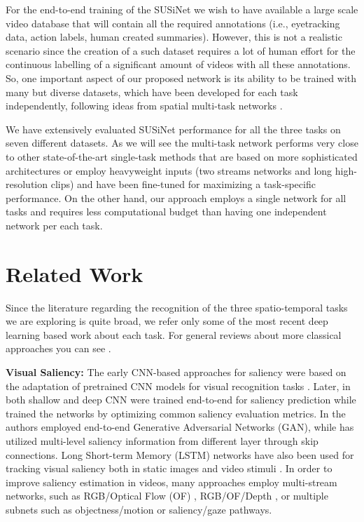 \documentclass[10pt,twocolumn,letterpaper]{article}
\begin{document}
For the end-to-end training of the SUSiNet we wish to have available a large scale video database that will contain all the required annotations (i.e., eyetracking data, action labels, human created summaries). 
However, this is not a realistic scenario since the creation of a such dataset requires a lot of human effort for the continuous labelling of a significant amount of videos with all these annotations. So, one important aspect of our proposed network is its ability to be trained with many but diverse datasets, which have been developed for each task independently, following ideas from spatial multi-task networks \cite{kokkinos2017ubernet}. 

We have extensively evaluated SUSiNet performance for all the three tasks on seven different datasets. As we will see the multi-task network performs very close to other state-of-the-art single-task methods that are based on more sophisticated architectures or employ heavyweight inputs \cite{carreira2017quo} (two streams networks and long high-resolution clips) and have been fine-tuned for maximizing a task-specific performance. On the other hand, our approach employs a single network for all tasks and requires less computational budget than having one independent network per each task. 

\section{Related Work}

Since the literature regarding the recognition of the three spatio-temporal tasks we are exploring is quite broad, we refer only some of the most recent deep learning based work about each task. For general reviews about more classical approaches you can see \cite{BoIt13,peng2016bag,Eva+13}.

\noindent\textbf{Visual Saliency:} 
The early CNN-based approaches for saliency were based on the adaptation of pretrained CNN models for visual recognition tasks \cite{Kummerer2014b,vig2014large}. Later, in \cite{Pan_2016_CVPR} both shallow and deep CNN were trained end-to-end for saliency prediction while \cite{huang2015salicon, jetley2016end} trained the networks by optimizing common saliency evaluation metrics. In \cite{Pan_2017_SalGAN} the authors employed end-to-end Generative Adversarial Networks (GAN), while \cite{wang2018deep} has utilized multi-level saliency information from different layer through skip connections. Long Short-term Memory (LSTM) networks have also been used for tracking visual saliency both in static images \cite{cornia2018predicting} and video stimuli \cite{wang2018revisiting}. In order to improve saliency estimation in videos, many approaches employ multi-stream networks, such as RGB/Optical Flow (OF) \cite{bak2017spatio}, RGB/OF/Depth \cite{leifman2017learning}, or multiple subnets such as objectness/motion \cite{jiang2018deepvs} or saliency/gaze \cite{Gorji_2018_CVPR} pathways.
\end{document}
